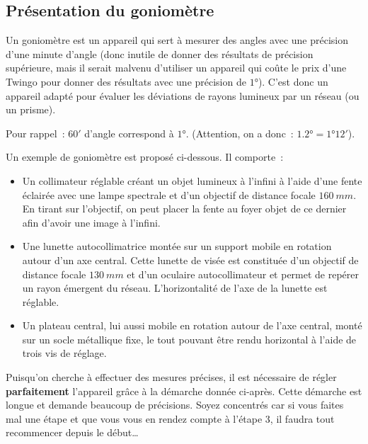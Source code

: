 \documentclass[a4paper, 12pt, final, garamond]{book}
\begin{document}
\subsection{Présentation du goniomètre}

Un goniomètre est un appareil qui sert à mesurer des angles avec une précision
d'une minute d'angle (donc inutile de donner des résultats de précision
supérieure, mais il serait malvenu d'utiliser un appareil qui coûte le prix
d'une Twingo pour donner des résultats avec une précision de $\ang{1;;}$). C'est
donc un appareil adapté pour évaluer les déviations de rayons lumineux par un
réseau (ou un prisme).

\medskip

Pour rappel~: $\ang{;60;}$ d'angle correspond à $\ang{1;;}$. (Attention, on a
donc~: $\ang{1.2;;}= \ang{1;12;}$).

\bigskip

Un exemple de goniomètre est proposé ci-dessous. Il comporte~: 

\begin{itemize}
    \item Un collimateur réglable créant un objet lumineux à l'infini à l'aide
        d'une fente éclairée avec une lampe spectrale et d'un objectif de
        distance focale $\SI{160}{mm}$. En tirant sur l'objectif, on peut placer
        la fente au foyer objet de ce dernier afin d'avoir une image à l'infini.
    \item Une lunette autocollimatrice montée sur un support mobile en rotation
        autour d'un axe central. Cette lunette de visée est constituée d'un
        objectif de distance focale $\SI{130}{mm}$ et d'un oculaire
        autocollimateur et permet de repérer un rayon émergent du réseau.
        L'horizontalité de l'axe de la lunette est réglable.
    \item Un plateau central, lui aussi mobile en rotation autour de l'axe
        central, monté sur un socle métallique fixe, le tout pouvant être rendu
        horizontal à l'aide de trois vis de réglage.
\end{itemize}

\medskip

Puisqu'on cherche à effectuer des mesures précises, il est nécessaire de régler
\textbf{parfaitement} l'appareil grâce à la démarche donnée ci-après. Cette
démarche est longue et demande beaucoup de précisions. Soyez concentrés car si
vous faites mal une étape et que vous vous en rendez compte à l'étape 3, il
faudra tout recommencer depuis le début…
\end{document}
